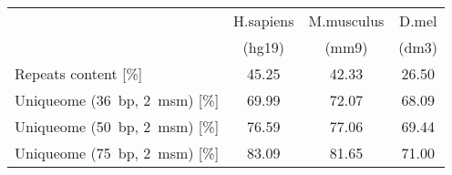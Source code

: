     \begin{tabular}{lccc}
    \toprule
    ~                                        & H.sapiens & M.musculus & D.mel \\
    ~                                        & (hg19) & (mm9) & (dm3) \\
    \midrule
    Repeats content [\%]               & 45.25            & 42.33            & 26.50      \\
    \midrule
    Uniqueome (36~bp, 2~msm) [\%]               & 69.99            & 72.07            & 68.09      \\
    Uniqueome (50~bp, 2~msm) [\%]               & 76.59            & 77.06            & 69.44      \\
    Uniqueome (75~bp, 2~msm) [\%]               & 83.09            & 81.65            & 71.00      \\
    \bottomrule
    \end{tabular}
